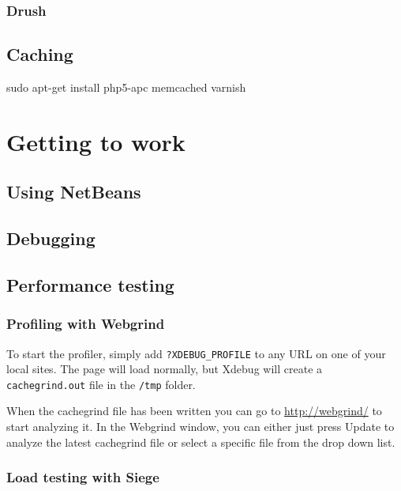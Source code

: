 \documentclass[ebook,10pt,twoside,openright]{memoir}
\begin{document}
\section{Drush}

\chapter{Caching} \label{chcaching}

\begin{squashboxcommand}
sudo apt-get install php5-apc memcached varnish
\end{squashboxcommand}

\part{Getting to work}

\chapter{Using NetBeans} \label{chusingnetbeans}
\chapterprecis{}

\chapter{Debugging} \label{chdebugging}

\chapter{Performance testing} \label{chperformance}

\section{Profiling with Webgrind}

To start the profiler, simply add \verb!?XDEBUG_PROFILE! to any URL on one of your local sites. The page will load normally, but Xdebug will create a \verb!cachegrind.out! file in the \verb!/tmp! folder.

When the cachegrind file has been written you can go to \url{http://webgrind/} to start analyzing it. In the Webgrind window, you can either just press Update to analyze the latest cachegrind file or select a specific file from the drop down list.


\section{Load testing with Siege}
\end{document}
